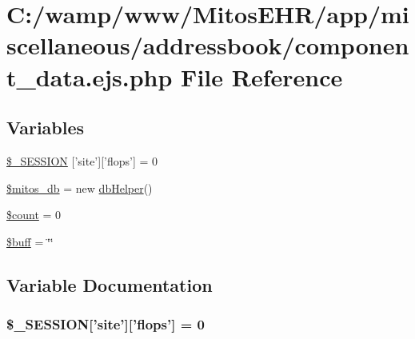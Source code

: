 \hypertarget{miscellaneous_2addressbook_2component__data_8ejs_8php}{\section{\-C\-:/wamp/www/\-Mitos\-E\-H\-R/app/miscellaneous/addressbook/component\-\_\-data.ejs.\-php \-File \-Reference}
\label{miscellaneous_2addressbook_2component__data_8ejs_8php}
}
\subsection*{\-Variables}
\begin{DoxyCompactItemize}
\item 
\hyperlink{miscellaneous_2addressbook_2component__data_8ejs_8php_a99fda8552a3e58235643b79f5af3ded8}{\$\-\_\-\-S\-E\-S\-S\-I\-O\-N} \mbox{[}'site'\mbox{]}\mbox{[}'flops'\mbox{]} = 0
\item 
\hyperlink{miscellaneous_2addressbook_2component__data_8ejs_8php_ab5d961f93efe4e2e8d8374f01dd6c65a}{\$mitos\-\_\-db} = new \hyperlink{classdb_helper}{db\-Helper}()
\item 
\hyperlink{miscellaneous_2addressbook_2component__data_8ejs_8php_af789423037bbc89dc7c850e761177570}{\$count} = 0
\item 
\hyperlink{miscellaneous_2addressbook_2component__data_8ejs_8php_aee88b745b9e14ca8b4227da600cea0b8}{\$buff} = \char`\"{}\char`\"{}
\end{DoxyCompactItemize}


\subsection{\-Variable \-Documentation}
\hypertarget{miscellaneous_2addressbook_2component__data_8ejs_8php_a99fda8552a3e58235643b79f5af3ded8}{
\subsubsection[{\$\-\_\-\-S\-E\-S\-S\-I\-O\-N}]{\setlength{\rightskip}{0pt plus 5cm}\$\-\_\-\-S\-E\-S\-S\-I\-O\-N\mbox{[}'site'\mbox{]}\mbox{[}'flops'\mbox{]} = 0}}\label{miscellaneous_2addressbook_2component__data_8ejs_8php_a99fda8552a3e58235643b79f5af3ded8}


